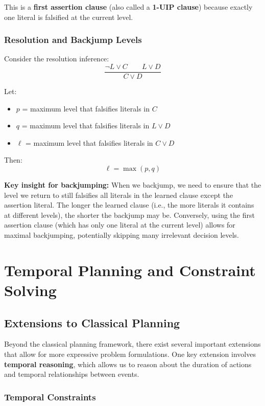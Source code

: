 \documentclass[11pt,a4paper]{article}
\theoremstyle{definition}
\theoremstyle{plain}
\theoremstyle{remark}
\begin{document}
This is a \textbf{first assertion clause} (also called a \textbf{1-UIP clause}) because exactly one literal is falsified at the current level.

\subsubsection{Resolution and Backjump Levels}

Consider the resolution inference:
\[
\frac{\neg L \lor C \quad\quad L \lor D}{C \lor D}
\]

Let:
\begin{itemize}
    \item $p$ = maximum level that falsifies literals in $C$
    \item $q$ = maximum level that falsifies literals in $L \lor D$
    \item $\ell$ = maximum level that falsifies literals in $C \lor D$
\end{itemize}

Then:
\[
\ell = \max(p, q)
\]

\textbf{Key insight for backjumping:} When we backjump, we need to ensure that the level we return to still falsifies all literals in the learned clause except the assertion literal. The longer the learned clause (i.e., the more literals it contains at different levels), the shorter the backjump may be. Conversely, using the first assertion clause (which has only one literal at the current level) allows for maximal backjumping, potentially skipping many irrelevant decision levels.


\newpage

\section{Temporal Planning and Constraint Solving}

\subsection{Extensions to Classical Planning}

Beyond the classical planning framework, there exist several important extensions that allow for more expressive problem formulations. One key extension involves \textbf{temporal reasoning}, which allows us to reason about the duration of actions and temporal relationships between events.

\subsubsection{Temporal Constraints}
\end{document}
